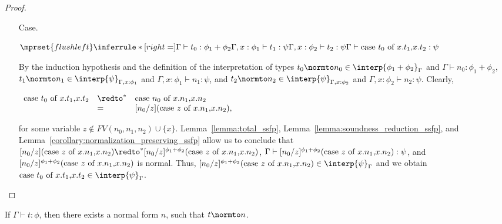 \begin{proof}
\begin{itemize}
\item[Case.]\ \\
  \begin{center}
    \begin{math}
      $$\mprset{flushleft}
      \inferrule* [right=] {
        \Gamma \vdash t_0:\phi_1 + \phi_2
        \\
	\Gamma,x:\phi_1 \vdash t_1:\psi
        \\
	\Gamma,x:\phi_2 \vdash t_2:\psi
      }{\Gamma \vdash \ccon{t_0}{x}{t_1}{t_2}: \psi}
    \end{math}
  \end{center}
  By the induction hypothesis and the definition of the interpretation of types
  $t_0 \normto n_0 \in \interp{\phi_1 + \phi_2}_\Gamma$ and $\Gamma \vdash n_0:\phi_1+\phi_2$, 
  $t_1 \normto n_1 \in \interp{\psi}_{\Gamma,x:\phi_1}$ and $\Gamma,x:\phi_1 \vdash n_1:\psi$, and
  $t_2 \normto n_2 \in \interp{\psi}_{\Gamma,x:\phi_2}$ and  $\Gamma,x:\phi_2 \vdash n_2:\psi$.  
  Clearly, 
  \begin{center}
    \begin{math}
      \begin{array}{lll}
        \ccon{t_0}{x}{t_1}{t_2} & \redto^* & \ccon{n_0}{x}{n_1}{n_2}\\
        & =        & [n_0/z](\ccon{z}{x}{n_1}{n_2}),
      \end{array}
    \end{math}
  \end{center}
  for some variable $z \not \in FV(n_0,n_1,n_2) \cup \{x\}$.  Lemma~\ref{lemma:total_ssfp}, 
  Lemma~\ref{lemma:soundness_reduction_ssfp}, and Lemma~\ref{corollary:normalization_preserving_ssfp} 
  allow us to conclude that $[n_0/z](\ccon{z}{x}{n_1}{n_2}) \redto^* [n_0/z]^{\phi_1+\phi_2}(\ccon{z}{x}{n_1}{n_2})$,
  $\Gamma \vdash [n_0/z]^{\phi_1+\phi_2}(\mbox{case}\ z\ \text{of}\ x\text{.}n_1\text{,}x\text{.}n_2) :\psi$, and $[n_0/z]^{\phi_1+\phi_2}(\mbox{case}\ z\ \text{of}\ x\text{.}n_1\text{,}x\text{.}n_2)$
  is normal.  Thus, $[n_0/z]^{\phi_1+\phi_2}(\ccon{z}{x}{n_1}{n_2}) \in \interp{\psi}_\Gamma$ and we obtain 
  $\ccon{t_0}{x}{t_1}{t_2} \in \interp{\psi}_\Gamma$. 
\end{itemize}
\end{proof}

\begin{corollary}[Normalization]
  If $\Gamma \vdash t:\phi$, then there exists a normal form $n$, such
  that $t \normto n$.
\end{corollary}

